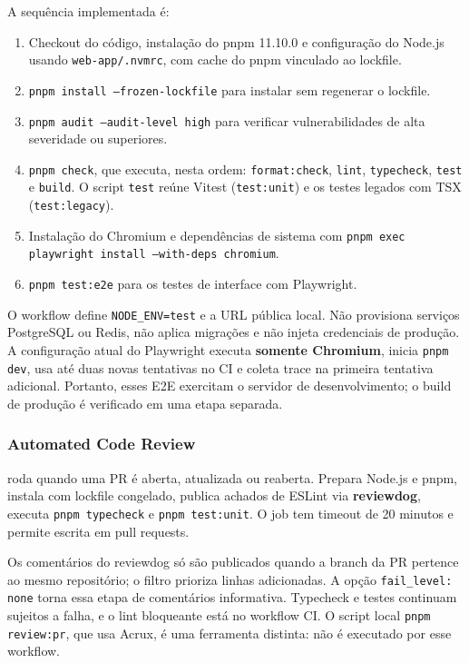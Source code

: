 \documentclass[12pt,a4paper]{article}
\begin{document}
A sequência implementada é:
\begin{enumerate}
  \item Checkout do código, instalação do pnpm 11.10.0 e configuração do Node.js usando \texttt{web-app/.nvmrc}, com cache do pnpm vinculado ao lockfile.
  \item \texttt{pnpm install --frozen-lockfile} para instalar sem regenerar o lockfile.
  \item \texttt{pnpm audit --audit-level high} para verificar vulnerabilidades de alta severidade ou superiores.
  \item \texttt{pnpm check}, que executa, nesta ordem: \texttt{format:check}, \texttt{lint}, \texttt{typecheck}, \texttt{test} e \texttt{build}. O script \texttt{test} reúne Vitest (\texttt{test:unit}) e os testes legados com TSX (\texttt{test:legacy}).
  \item Instalação do Chromium e dependências de sistema com \texttt{pnpm exec playwright install --with-deps chromium}.
  \item \texttt{pnpm test:e2e} para os testes de interface com Playwright.
\end{enumerate}

O workflow define \texttt{NODE\_ENV=test} e a URL pública local. Não provisiona serviços PostgreSQL ou Redis, não aplica migrações e não injeta credenciais de produção. A configuração atual do Playwright executa \textbf{somente Chromium}, inicia \texttt{pnpm dev}, usa até duas novas tentativas no CI e coleta trace na primeira tentativa adicional. Portanto, esses E2E exercitam o servidor de desenvolvimento; o build de produção é verificado em uma etapa separada.

\subsubsection{Automated Code Review}
 roda quando uma PR é aberta, atualizada ou reaberta. Prepara Node.js e pnpm, instala com lockfile congelado, publica achados de ESLint via \textbf{reviewdog}, executa \texttt{pnpm typecheck} e \texttt{pnpm test:unit}. O job tem timeout de 20 minutos e permite escrita em pull requests.

Os comentários do reviewdog só são publicados quando a branch da PR pertence ao mesmo repositório; o filtro prioriza linhas adicionadas. A opção \texttt{fail\_level: none} torna essa etapa de comentários informativa. Typecheck e testes continuam sujeitos a falha, e o lint bloqueante está no workflow CI. O script local \texttt{pnpm review:pr}, que usa Acrux, é uma ferramenta distinta: não é executado por esse workflow.
\end{document}
